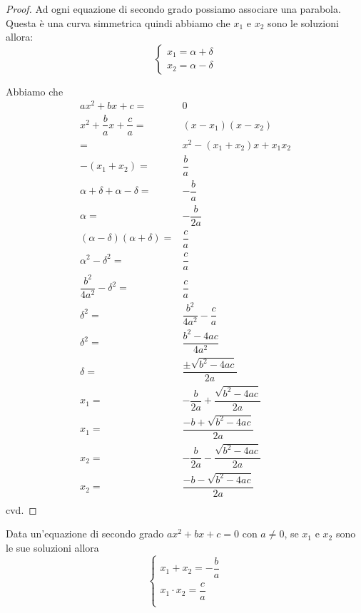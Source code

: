 \begin{proof}
	Ad ogni equazione di secondo grado possiamo associare una parabola. Questa  
	è una curva simmetrica quindi abbiamo che $x_1$ e $x_2$ sono le soluzioni 
	allora:\begin{equation}\label{eqn:Equasectre}
		\left\{\begin{array}{l}
			x_1=\alpha+\delta\\
			x_2=\alpha-\delta
		\end{array}\right.
	\end{equation}
	
	Abbiamo che
	\begin{align*}
		ax^2+bx+c=&0\\
		x^2+\dfrac{b}{a}x+\dfrac{c}{a}=&(x-x_1)(x-x_2)\\
		=&x^2-(x_1+x_2)x+x_1x_2\\
		-(x_1+x_2)=&\dfrac{b}{a}\\
		\alpha+\delta+\alpha-\delta=&-\dfrac{b}{a}\\
		\alpha=&-\dfrac{b}{2a}\\
		(\alpha-\delta)(\alpha+\delta)=&\dfrac{c}{a}\\
		\alpha^2-\delta^2=&\dfrac{c}{a}\\
		\dfrac{b^2}{4a^2}-\delta^2=&\dfrac{c}{a}\\
		\delta^2=&\dfrac{b^2}{4a^2}-\dfrac{c}{a}\\
		\delta^2=&\dfrac{b^2-4ac}{4a^2}\\
		\delta=&\dfrac{\pm\sqrt{b^2-4ac}}{2a}\\
		x_1=&-\dfrac{b}{2a}+\dfrac{\sqrt{b^2-4ac}}{2a}\\
		x_1=&\dfrac{-b+\sqrt{b^2-4ac}}{2a}\\
		x_2=&-\dfrac{b}{2a}-\dfrac{\sqrt{b^2-4ac}}{2a}\\
		x_2=&\dfrac{-b-\sqrt{b^2-4ac}}{2a}\\
	\end{align*}
	cvd.
\end{proof}
\begin{cor}\label{cor:secondogradopropsoluzioni}
Data un'equazione di secondo grado $ax^2+bx+c=0$ con $a\neq 0$, se $x_1$ e $x_2$ sono le sue soluzioni allora\[\begin{cases}
	x_1+x_2=-\dfrac{b}{a}\\
	x_1\cdot x_2=\dfrac{c}{a}\\
\end{cases}\]
\end{cor}
